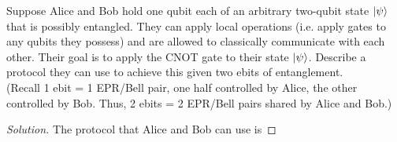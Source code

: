 \begin{solution}[label=ques:2a]
  \begin{question}
    Suppose Alice and Bob hold one qubit each of an arbitrary two-qubit state $\ket{\psi}$ that is possibly entangled. They can apply local operations (i.e. apply gates to any qubits they possess) and are allowed to classically communicate with each other. Their goal is to apply the CNOT gate to their state $\ket{\psi}$. Describe a protocol they can use to achieve this given two ebits of entanglement. 
\\ (Recall 1 ebit = 1 EPR/Bell pair, one half controlled by Alice, the other controlled by Bob. Thus, 2 ebits = 2 EPR/Bell pairs shared by Alice and Bob.)
  \end{question}
  \tcblower{}
  \begin{proof}[Solution]
    The protocol that Alice and Bob can use is
  \end{proof}
\end{solution}
